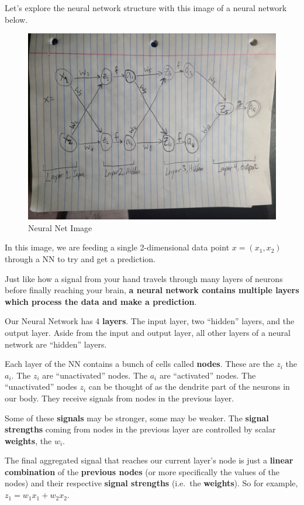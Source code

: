 \documentclass[
]{article}
\begin{document}
Let's explore the neural network structure with this image of a neural
network below.

\begin{figure}
\centering
\includegraphics{nn_image.jpg}
\caption{Neural Net Image}
\end{figure}

In this image, we are feeding a single 2-dimensional data point
\(x = (x_1, x_2)\) through a NN to try and get a prediction.

Just like how a signal from your hand travels through many layers of
neurons before finally reaching your brain, \textbf{a neural network
contains multiple layers which process the data and make a prediction}.

Our Neural Network has 4 \textbf{layers}. The input layer, two
``hidden'' layers, and the output layer. Aside from the input and output
layer, all other layers of a neural network are ``hidden'' layers.

Each layer of the NN contains a bunch of cells called \textbf{nodes}.
These are the \(z_i\) the \(a_i\). The \(z_i\) are ``unactivated''
nodes. The \(a_i\) are ``activated'' nodes. The ``unactivated'' nodes
\(z_i\) can be thought of as the dendrite part of the neurons in our
body. They receive signals from nodes in the previous layer.

Some of these \textbf{signals} may be stronger, some may be weaker. The
\textbf{signal strengths} coming from nodes in the previous layer are
controlled by scalar \textbf{weights}, the \(w_i\).

The final aggregated signal that reaches our current layer's node is
just a \textbf{linear combination} of the \textbf{previous nodes} (or
more specifically the values of the nodes) and their respective
\textbf{signal strengths} (i.e.~the \textbf{weights}). So for example,
\(z_1 = w_1x_1 + w_2x_2\).
\end{document}
